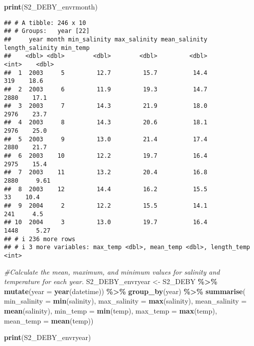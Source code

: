 \documentclass[
]{article}
\newenvironment{Shaded}{\begin{snugshade}}{\end{snugshade}}
\newcommand{\AttributeTok}[1]{\textcolor[rgb]{0.13,0.29,0.53}{#1}}
\newcommand{\CommentTok}[1]{\textcolor[rgb]{0.56,0.35,0.01}{\textit{#1}}}
\newcommand{\FunctionTok}[1]{\textcolor[rgb]{0.13,0.29,0.53}{\textbf{#1}}}
\newcommand{\NormalTok}[1]{#1}
\newcommand{\OtherTok}[1]{\textcolor[rgb]{0.56,0.35,0.01}{#1}}
\newcommand{\SpecialCharTok}[1]{\textcolor[rgb]{0.81,0.36,0.00}{\textbf{#1}}}
\begin{document}
\begin{Shaded}
\begin{Highlighting}[]
\FunctionTok{print}\NormalTok{(S2\_DEBY\_envrmonth)}
\end{Highlighting}
\end{Shaded}

\begin{verbatim}
## # A tibble: 246 x 10
## # Groups:   year [22]
##     year month min_salinity max_salinity mean_salinity length_salinity min_temp
##    <dbl> <dbl>        <dbl>        <dbl>         <dbl>           <int>    <dbl>
##  1  2003     5         12.7         15.7          14.4             319    18.6 
##  2  2003     6         11.9         19.3          14.7            2880    17.1 
##  3  2003     7         14.3         21.9          18.0            2976    23.7 
##  4  2003     8         14.3         20.6          18.1            2976    25.0 
##  5  2003     9         13.0         21.4          17.4            2880    21.7 
##  6  2003    10         12.2         19.7          16.4            2975    15.4 
##  7  2003    11         13.2         20.4          16.8            2880     9.61
##  8  2003    12         14.4         16.2          15.5              33    10.4 
##  9  2004     2         12.2         15.5          14.1             241     4.5 
## 10  2004     3         13.0         19.7          16.4            1448     5.27
## # i 236 more rows
## # i 3 more variables: max_temp <dbl>, mean_temp <dbl>, length_temp <int>
\end{verbatim}

\begin{Shaded}
\begin{Highlighting}[]
\CommentTok{\#Calculate the mean, maximum, and minimum values for salinity and temperature for each year. }
\NormalTok{S2\_DEBY\_envryear }\OtherTok{\textless{}{-}}\NormalTok{ S2\_DEBY }\SpecialCharTok{\%\textgreater{}\%}
    \FunctionTok{mutate}\NormalTok{(}\AttributeTok{year =} \FunctionTok{year}\NormalTok{(datetime)) }\SpecialCharTok{\%\textgreater{}\%}
    \FunctionTok{group\_by}\NormalTok{(year) }\SpecialCharTok{\%\textgreater{}\%}
    \FunctionTok{summarise}\NormalTok{(}
      \AttributeTok{min\_salinity =} \FunctionTok{min}\NormalTok{(salinity),}
      \AttributeTok{max\_salinity =} \FunctionTok{max}\NormalTok{(salinity),}
      \AttributeTok{mean\_salinity =} \FunctionTok{mean}\NormalTok{(salinity),}
      \AttributeTok{min\_temp =} \FunctionTok{min}\NormalTok{(temp),}
      \AttributeTok{max\_temp =} \FunctionTok{max}\NormalTok{(temp),}
      \AttributeTok{mean\_temp =} \FunctionTok{mean}\NormalTok{(temp))}

\FunctionTok{print}\NormalTok{(S2\_DEBY\_envryear)}
\end{Highlighting}
\end{Shaded}
\end{document}
